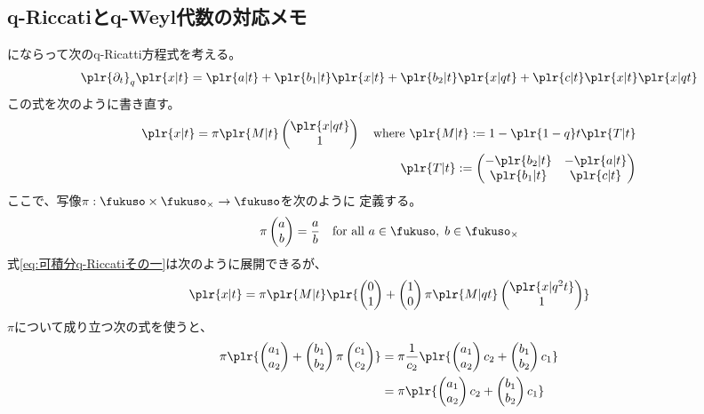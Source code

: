 {\subsection{q-Riccatiとq-Weyl代数の対応メモ}\label{s2:q-Riccatiとq-Weyl代数の対応メモ} %
	\cite{hirota:2003}にならって次のq-Ricatti方程式を考える。
	\begin{equation}\label{eq:可積分q-Riccatiの定義}\begin{split}
		\plr{\partial_t}_q\plr{x|t}
		= \plr{a|t} + \plr{b_1|t}\plr{x|t} + \plr{b_2|t}\plr{x|qt}
			+ \plr{c|t}\plr{x|t}\plr{x|qt}
	\end{split}\end{equation}
	この式を次のように書き直す。
	\begin{equation}\label{eq:可積分q-Riccatiその一}\begin{split}
		\plr{x|t} = \pi\plr{M|t}\pvec{\plr{x|qt}}{1} \quad\text{where }
		\plr{M|t} := 1 - \plr{1 - q}t\plr{T|t} \\
		\plr{T|t} := \begin{pmatrix}
			-\plr{b_2|t} & -\plr{a|t} \\ \plr{b_1|t} & \plr{c|t}
		\end{pmatrix}
	\end{split}\end{equation}
	ここで、写像$\pi:\fukuso\times\fukuso_\times\to\fukuso$を次のように
	定義する。
	\begin{equation*}\begin{split}
		\pi\pvec{a}{b} = \frac{a}{b}
		\quad\text{for all } a\in\fukuso,\; b\in\fukuso_\times
	\end{split}\end{equation*}
	式\eqref{eq:可積分q-Riccatiその一}は次のように展開できるが、
	\begin{equation*}\begin{split}
		\plr{x|t} = \pi\plr{M|t}\plr{\pvec{0}{1} 
			+ \pvec{1}{0}\pi\plr{M|qt}\pvec{\plr{x|q^2t}}{1}}
	\end{split}\end{equation*}
	$\pi$について成り立つ次の式を使うと、
	\begin{equation*}\begin{split}
		\pi\plr{\pvec{a_1}{a_2}+\pvec{b_1}{b_2}\pi\pvec{c_1}{c_2}}
		&= \pi\frac{1}{c_2}\plr{\pvec{a_1}{a_2}c_2+\pvec{b_1}{b_2}c_1} \\
		&= \pi\plr{\pvec{a_1}{a_2}c_2+\pvec{b_1}{b_2}c_1} \\
	\end{split}\end{equation*}
}

